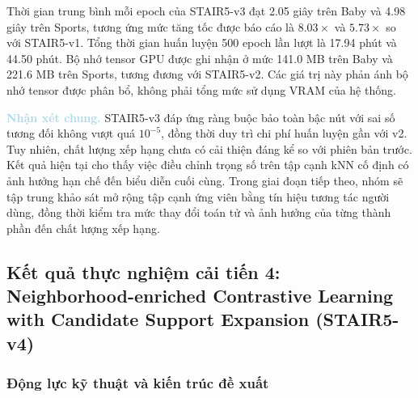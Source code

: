 \begin{table}[!htbp]
    \centering
    \caption{Chi phí tính toán và bộ nhớ tensor GPU của STAIR5-v3.}
    \label{tab:stair_dp_hardware}
    \footnotesize
    \renewcommand{\arraystretch}{1.15}
    \setlength{\tabcolsep}{4pt}

\end{table}

Thời gian trung bình mỗi epoch của STAIR5-v3 đạt 2.05 giây trên Baby và 4.98 giây trên Sports, tương ứng mức tăng tốc được báo cáo là $8.03\times$ và $5.73\times$ so với STAIR5-v1. Tổng thời gian huấn luyện 500 epoch lần lượt là 17.94 phút và 44.50 phút. Bộ nhớ tensor GPU được ghi nhận ở mức 141.0 MB trên Baby và 221.6 MB trên Sports, tương đương với STAIR5-v2. Các giá trị này phản ánh bộ nhớ tensor được phân bổ, không phải tổng mức sử dụng VRAM của hệ thống.

\noindent\textcolor{lightblue}{\textbf{Nhận xét chung.}} STAIR5-v3 đáp ứng ràng buộc bảo toàn bậc nút với sai số tương đối không vượt quá $10^{-5}$, đồng thời duy trì chi phí huấn luyện gần với v2. Tuy nhiên, chất lượng xếp hạng chưa có cải thiện đáng kể so với phiên bản trước. Kết quả hiện tại cho thấy việc điều chỉnh trọng số trên tập cạnh kNN cố định có ảnh hưởng hạn chế đến biểu diễn cuối cùng. Trong giai đoạn tiếp theo, nhóm sẽ tập trung khảo sát mở rộng tập cạnh ứng viên bằng tín hiệu tương tác người dùng, đồng thời kiểm tra mức thay đổi toán tử và ảnh hưởng của từng thành phần đến chất lượng xếp hạng.

\subsection{Kết quả thực nghiệm cải tiến 4: Neighborhood-enriched Contrastive Learning with Candidate Support Expansion (STAIR5-v4)}

\subsubsection{Động lực kỹ thuật và kiến trúc đề xuất}

